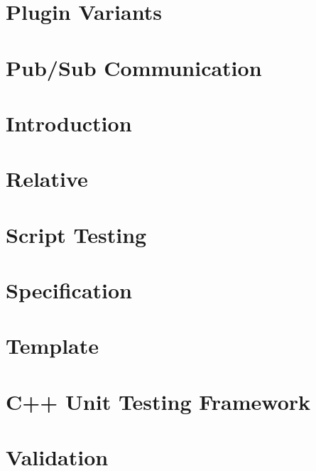\documentclass[twoside]{book}
\newcommand{\+}{\discretionary{\mbox{\scriptsize$\hookleftarrow$}}{}{}}
\begin{document}
\chapter{Plugin Variants}
\label{doc_decisions_plugin_variants_md}

\chapter{Pub/\+Sub Communication}
\label{doc_decisions_pubsub_md}

\chapter{Introduction}
\label{doc_decisions_README_md}

\chapter{Relative}
\label{doc_decisions_relative_md}

\chapter{Script Testing}
\label{doc_decisions_script_testing_md}

\chapter{Specification}
\label{doc_decisions_specification_md}

\chapter{Template}
\label{doc_decisions_template_md}

\chapter{C++ Unit Testing Framework}
\label{doc_decisions_unit_testing_md}

\chapter{Validation}
\label{doc_decisions_validation_md}

\end{document}
